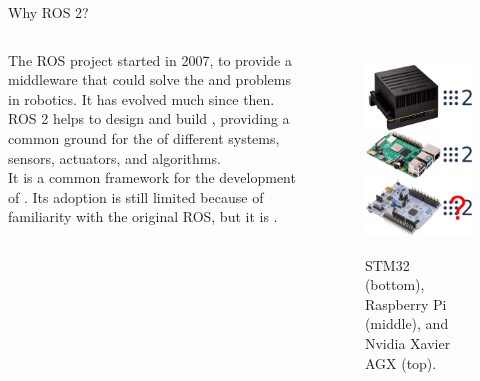 \begin{frame}{Why ROS 2?}
	\begin{columns}
    The ROS project started in 2007, to provide a middleware that could solve the  and  problems in robotics. It has evolved much since then.
    \newline\newline
		ROS 2 helps to design and build , providing a common ground for the  of different systems, sensors, actuators, and algorithms.\\
    It is a common framework for the development of .
    \newline\newline
    Its adoption is still limited because of familiarity with the original ROS, but it is .

		\begin{figure}
			\centering
      \includegraphics[scale=.17]{why_ros2.png}
      \label{fig:whyros2}
      \caption{STM32 (bottom), Raspberry Pi (middle), and Nvidia Xavier AGX (top).}
		\end{figure}
	\end{columns}
\end{frame}

